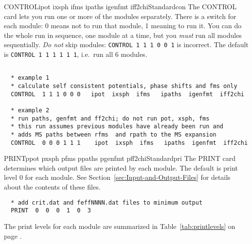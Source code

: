\documentclass[11pt,oneside]{report} %
\begin{document}
\begin{Card}{CONTROL}{ipot ixsph ifms ipaths igenfmt iff2chi}{Standard}{con}
  The CONTROL card lets you run one or more of the modules separately.
  There is a switch for each module: 0 means not to run that module, 1
  meaning to run it.  You can do the whole run in sequence, one module
  at a time, but you \emph{must} run all modules sequentially.
  \emph{Do not} skip modules: \hbox{\texttt{CONTROL 1 1 1 0 0 1}}
  is incorrect.  The default is \hbox{\texttt{CONTROL 1 1 1 1 1 1}},
  i.e.\ run all 6 modules.
\begin{verbatim}

  * example 1
  * calculate self consistent potentials, phase shifts and fms only
  CONTROL  1 1 1 0 0 0   ipot  ixsph  ifms   ipaths  igenfmt  iff2chi

  * example 2
  * run paths, genfmt and ff2chi; do not run pot, xsph, fms
  * this run assumes previous modules have already been run and
  * adds MS paths between rfms  and rpath to the MS expansion
  CONTROL  0 0 0 1 1 1    ipot  ixsph  ifms   ipaths  igenfmt  iff2chi
\end{verbatim}

\end{Card}


\begin{Card}{PRINT}{ppot pxsph pfms ppaths pgenfmt pff2chi}{Standard}{pri}
  The PRINT card determines which output files are printed by each
  module.  The default is print level 0 for each module.  See
  Section~\ref{sec:Input-and-Output-Files} for details about the contents of
  these files.
\begin{verbatim}
  * add crit.dat and feffNNNN.dat files to minimum output
  PRINT  0  0  0  1  0  3
\end{verbatim}
  The print levels for each module are summarized in
  Table~\ref{tab:printlevels} on page \pageref{tab:printlevels}.
\end{Card}
\end{document}
